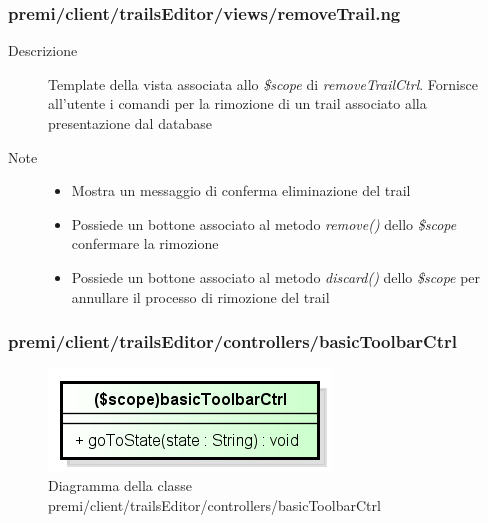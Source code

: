 \subsubsection{premi/client/trailsEditor/views/removeTrail.ng}

\begin{description}
\item[Descrizione] \hfill
	Template della vista associata allo \textit{\$scope} di \textit{removeTrailCtrl}. Fornisce all'utente i comandi per la rimozione di un trail associato alla presentazione dal database
\item[Note] \hfill
	\begin{itemize}
			\item Mostra un messaggio di conferma eliminazione del trail
			\item Possiede un bottone associato al metodo \textit{remove()} dello \textit{\$scope} confermare la rimozione
			\item Possiede un bottone associato al metodo \textit{discard()} dello \textit{\$scope} per annullare il processo di rimozione del trail
	\end{itemize}
\end{description}

































\subsubsection{premi/client/trailsEditor/controllers/basicToolbarCtrl}
\begin{figure}[h]
\begin{center}
\includegraphics[scale=0.55]{img/diacla/basicToolbarCtrl.png}
\caption{Diagramma della classe premi/client/trailsEditor/controllers/basicToolbarCtrl}
\end{center}
\end{figure}


